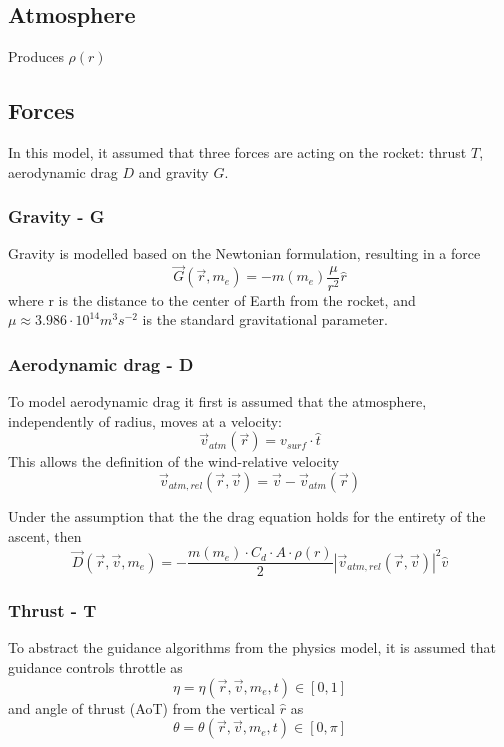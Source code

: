\documentclass[11pt]{article}
\begin{document}
\subsection{Atmosphere}
%
%
Produces $\rho(r)$

\subsection{Forces}
In this model, it assumed that three forces are acting on the rocket: thrust $T$, aerodynamic drag $D$ and gravity $G$.

\subsubsection{Gravity - G}
Gravity is modelled based on the Newtonian formulation, resulting in a force
$$
\vec{G}(\vec{r}, m_e) = -m(m_e) \frac{\mu}{r^2} \hat{r} 
$$
where r is the distance to the center of Earth from the rocket, and $\mu \approx 3.986\cdot10^{14} m^3 s^{−2}$ is the standard gravitational parameter.

\subsubsection{Aerodynamic drag - D}
% 
%
To model aerodynamic drag it first is assumed that the atmosphere, independently of radius, moves at a velocity:
$$
\vec{v}_{atm} (\vec{r}) = v_{surf} \cdot \hat{t}
$$
This allows the definition of the wind-relative velocity
$$
\vec{v}_{atm,rel} (\vec{r}, \vec{v}) = \vec{v} - \vec{v}_{atm} (\vec{r})
$$

%
%
Under the assumption that the the drag equation holds for the entirety of the ascent, then
$$
\vec{D}(\vec{r}, \vec{v}, m_e) = - \frac{ m(m_e) \cdot  C_d  \cdot A \cdot \rho(r) }{2} {\left| \vec{v}_{atm,rel} (\vec{r}, \vec{v}) \right|}^2 \hat{v}
$$
\subsubsection{Thrust - T}

%
%

To abstract the guidance algorithms from the physics model, it is assumed that guidance controls throttle as
$$
\eta = \eta(\vec{r}, \vec{v}, m_e, t)\in[0,1]
$$
and angle of thrust (AoT) from the vertical $\hat{r}$ as
$$
\theta = \theta(\vec{r}, \vec{v}, m_e, t)\in\left[0,\pi\right]
$$
\end{document}

